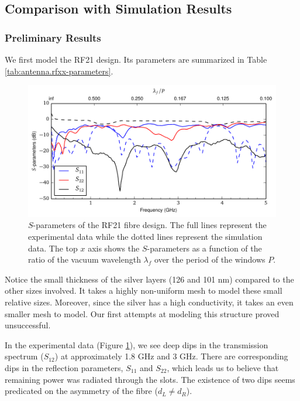 \subsection{Comparison with Simulation Results}

\subsubsection{Preliminary Results}
We first model the RF21 design. Its parameters are summarized in 
Table \ref{tab:antenna.rfxx-parameters}. 

\begin{figure}
 \centering
 \includegraphics[width=\textwidth]{figs/active/sParametersRF21.pdf}
 \caption[$S$-parameters of the RF21 fibre design]
 		{$S$-parameters of the RF21 fibre design. The full lines represent
	  	the experimental data while the dotted lines represent the simulation data.
	  	The top $x$ axis shows the $S$-parameters as a function of the ratio of the 
	  	vacuum wavelength $\lambda_f$ over the period of the windows $P$.}
 \label{fig:antenna.sParameters}
\end{figure}

Notice the small thickness
of the silver layers (126 and 101 nm) compared to the other 
sizes involved. It takes a highly non-uniform mesh to model
these small relative sizes. Moreover, since the silver has a high
conductivity, it takes an even smaller mesh to model. Our first 
attempts at modeling this structure proved unsuccessful.

In the experimental data (\see Figure \ref{fig:antenna.sParameters}), 
we see deep dips in the transmission spectrum ($S_{12}$) at approximately
1.8 GHz and 3 GHz. There are corresponding dips in the reflection parameters,
$S_{11}$ and $S_{22}$, which leads us to believe that remaining power 
was radiated through the slots. The existence of two dips seems predicated on the asymmetry
of the fibre ($d_L\neq d_R$). 

